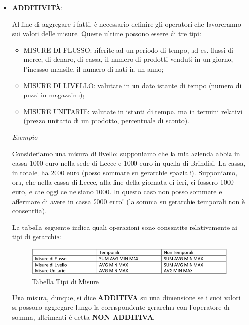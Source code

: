 \begin{itemize}
\item{\underline{\textbf{ADDITIVIT\`A}}}:

Al fine di aggregare i fatti, è necessario definire gli operatori che lavoreranno sui valori delle misure. Queste ultime possono essere di tre tipi:

\begin{itemize}

\item{MISURE DI FLUSSO}: riferite ad un periodo di tempo, ad es. flussi di merce, di denaro, di cassa, il numero di prodotti venduti in un giorno, l’incasso                                              mensile, il numero di nati in un anno;
\item{MISURE DI LIVELLO}: valutate in un dato istante di tempo (numero di pezzi in                                               magazzino);
\item{MISURE UNITARIE}: valutate in istanti di tempo, ma in termini relativi (prezzo                                             unitario di un prodotto, percentuale di sconto).   

\end{itemize}

\textit{Esempio}

Consideriamo una misura di livello: supponiamo che la mia azienda abbia in cassa 1000 euro nella sede di Lecce e 1000 euro in quella di Brindisi. La cassa, in totale, ha 2000 euro (posso sommare su gerarchie spaziali). Supponiamo, ora, che nella cassa di Lecce, alla fine della giornata di ieri, ci fossero 1000 euro, e che oggi ce ne siano 1000. In questo caso non posso sommare e affermare di avere in cassa 2000 euro! (la somma su gerarchie temporali non è consentita).  

La tabella seguente indica quali operazioni sono consentite relativamente ai tipi di gerarchie: 

\begin{center}
\begin{figure}[H]
\centering
\includegraphics[scale=0.8]{figures/tabella_misure.png}
\caption{Tabella Tipi di Misure}
\end{figure}
\end{center}

Una misura, dunque, si dice \textbf{ADDITIVA} su una dimensione se i suoi valori si possono aggregare lungo la corrispondente gerarchia con l’operatore di somma, altrimenti è detta \textbf{NON ADDITIVA}.


\end{itemize}
